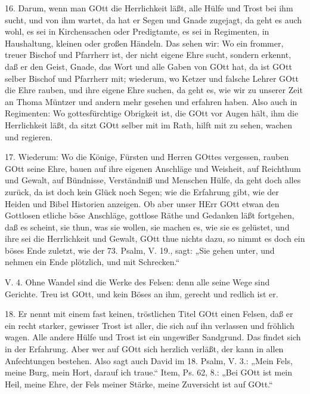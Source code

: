 16. Darum, wenn man GOtt die Herrlichkeit läßt, alle Hülfe und Trost bei ihm sucht, und von ihm wartet, da hat er Segen und Gnade zugejagt, da geht es auch wohl, es sei in Kirchensachen oder Predigtamte, es sei in Regimenten, in Haushaltung, kleinen oder großen Händeln. Das sehen wir: Wo ein frommer, treuer Bischof und Pfarrherr ist, der nicht eigene Ehre sucht, sondern erkennt, daß er den Geist, Gnade, das Wort und alle Gaben von GOtt hat, da ist GOtt selber Bischof und Pfarrherr mit; wiederum, wo Ketzer und falsche Lehrer GOtt die Ehre rauben, und ihre eigene Ehre suchen, da geht es, wie wir zu unserer Zeit an Thoma Müntzer und andern mehr gesehen und erfahren haben. Also auch in Regimenten: Wo gottesfürchtige Obrigkeit ist, die GOtt vor Augen hält, ihm die Herrlichkeit läßt, da sitzt GOtt selber mit im Rath, hilft mit zu sehen, wachen und regieren.

17. Wiederum: Wo die Könige, Fürsten und Herren GOttes vergessen, rauben GOtt seine Ehre, bauen auf ihre eigenen Anschläge und Weisheit, auf Reichthum und Gewalt, auf Bündnisse, Verständniß und Menschen Hülfe, da geht doch alles zurück, da ist doch kein Glück noch Segen; wie die Erfahrung gibt, wie der Heiden und Bibel Historien anzeigen. Ob aber unser HErr GOtt etwan den Gottlosen etliche böse Anschläge, gottlose Räthe und Gedanken läßt fortgehen, daß es scheint, sie thun, was sie wollen, sie machen es, wie sie es gelüstet, und ihre sei die Herrlichkeit und Gewalt, GOtt thue nichts dazu, so nimmt es doch ein böses Ende zuletzt, wie der 73. Psalm, V. 19., sagt: „Sie gehen unter, und nehmen ein Ende plötzlich, und mit Schrecken.“

\begin{schriftzitat}
V. 4. Ohne Wandel sind die Werke des Felsen: denn alle seine Wege sind Gerichte. Treu ist GOtt, und kein Böses an ihm, gerecht und redlich ist er.
\end{schriftzitat}

18. Er nennt mit einem fast keinen, tröstlichen Titel GOtt einen Felsen, daß er ein recht starker, gewisser Trost ist aller, die sich auf ihn verlassen und fröhlich wagen. Alle andere Hülfe und Trost ist ein ungewißer Sandgrund. Das findet sich in der Erfahrung. Aber wer auf GOtt sich herzlich verläßt, der kann in allen Anfechtungen bestehen. Also sagt auch David im 18. Psalm, V. 3.: „Mein Fels, meine Burg, mein Hort, darauf ich traue.“ Item, Ps. 62, 8.: „Bei GOtt ist mein Heil, meine Ehre, der Fels meiner Stärke, meine Zuversicht ist auf GOtt.“

